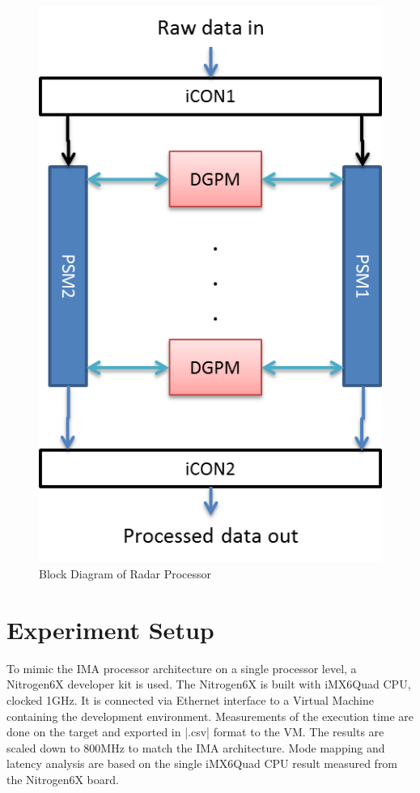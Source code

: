 \begin{figure}[h!]
	\centering
	\includegraphics[]{figures/radar_processor}
	\caption{Block Diagram of Radar Processor \cite{fcas}}
	\label{fig:bg_related_work:ima:radar_processor}
\end{figure}

\section{Experiment Setup}
\label{s:bg_related_work:exp_setup}
To mimic the IMA processor architecture on a single processor level, a Nitrogen6X developer kit is used. The Nitrogen6X is built with iMX6Quad CPU, clocked 1GHz. It is connected via Ethernet interface to a Virtual Machine containing the development environment. Measurements of the execution time are done on the target and exported in \bverb|.csv| format to the VM. The results are scaled down to 800MHz to match the IMA architecture. Mode mapping and latency analysis are based on the single iMX6Quad CPU result measured from the Nitrogen6X board.

